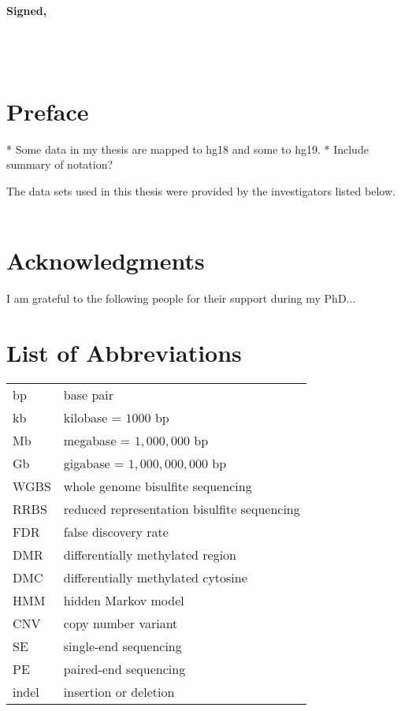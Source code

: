 \documentclass[11pt,a4paper,oneside]{book}	%
\begin{document}
\vspace{2cm}


{\large\bf Signed,\\\\\\\\}



\chapter{Preface}

* Some data in my thesis are mapped to hg18 and some to hg19.
* Include summary of notation?


The data sets used in this thesis were provided by the investigators listed below.\\\\

\chapter{Acknowledgments}

I am grateful to the following people for their support during my PhD...


\tableofcontents

\listoffigures

\listoftables


\chapter{List of Abbreviations}

\begin{tabular}{ll}

bp & base pair \\
kb & kilobase = $1000$ bp \\
Mb & megabase = $1,000,000$ bp \\
Gb & gigabase = $1,000,000,000$ bp \\
WGBS & whole genome bisulfite sequencing \\
RRBS & reduced representation bisulfite sequencing \\
FDR & false discovery rate \\
DMR & differentially methylated region \\
DMC & differentially methylated cytosine \\
HMM & hidden Markov model \\
CNV & copy number variant \\
SE & single-end sequencing \\
PE & paired-end sequencing \\
indel & insertion or deletion \\

\end{tabular}
\end{document}
